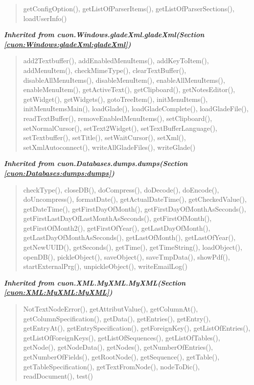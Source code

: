\begin{quote}
getConfigOption(), getListOfParserItems(), getListOfParserSections(), loadUserInfo()
\end{quote}

\large{\textbf{\textit{Inherited from cuon.Windows.gladeXml.gladeXml\textit{(Section \ref{cuon:Windows:gladeXml:gladeXml})}}}}

\begin{quote}
add2Textbuffer(), addEnabledMenuItems(), addKeyToItem(), addMenuItem(), checkMimeType(), clearTextBuffer(), disableAllMenuItems(), disableMenuItem(), enableAllMenuItems(), enableMenuItem(), getActiveText(), getClipboard(), getNotesEditor(), getWidget(), getWidgets(), gotoTreeItem(), initMenuItems(), initMenuItemsMain(), loadGlade(), loadGladeComplete(), loadGladeFile(), readTextBuffer(), removeEnabledMenuItems(), setClipboard(), setNormalCursor(), setText2Widget(), setTextBufferLanguage(), setTextbuffer(), setTitle(), setWaitCursor(), setXml(), setXmlAutoconnect(), writeAllGladeFiles(), writeGlade()
\end{quote}

\large{\textbf{\textit{Inherited from cuon.Databases.dumps.dumps\textit{(Section \ref{cuon:Databases:dumps:dumps})}}}}

\begin{quote}
checkType(), closeDB(), doCompress(), doDecode(), doEncode(), doUncompress(), formatDate(), getActualDateTime(), getCheckedValue(), getDateTime(), getFirstDayOfMonth(), getFirstDayOfMonthAsSeconds(), getFirstLastDayOfLastMonthAsSeconds(), getFirstOfMonth(), getFirstOfMonth2(), getFirstOfYear(), getLastDayOfMonth(), getLastDayOfMonthAsSeconds(), getLastOfMonth(), getLastOfYear(), getNewUUID(), getSeconds(), getTime(), getTimeString(), loadObject(), openDB(), pickleObject(), saveObject(), saveTmpData(), showPdf(), startExternalPrg(), unpickleObject(), writeEmailLog()
\end{quote}

\large{\textbf{\textit{Inherited from cuon.XML.MyXML.MyXML\textit{(Section \ref{cuon:XML:MyXML:MyXML})}}}}

\begin{quote}
NotTextNodeError(), getAttributValue(), getColumnAt(), getColumnSpecification(), getData(), getEntries(), getEntry(), getEntryAt(), getEntrySpecification(), getForeignKey(), getListOfEntries(), getListOfForeignKeys(), getListOfSequences(), getListOfTables(), getNode(), getNodeData(), getNodes(), getNumberOfEntries(), getNumberOfFields(), getRootNode(), getSequence(), getTable(), getTableSpecification(), getTextFromNode(), nodeToDic(), readDocument(), test()
\end{quote}

